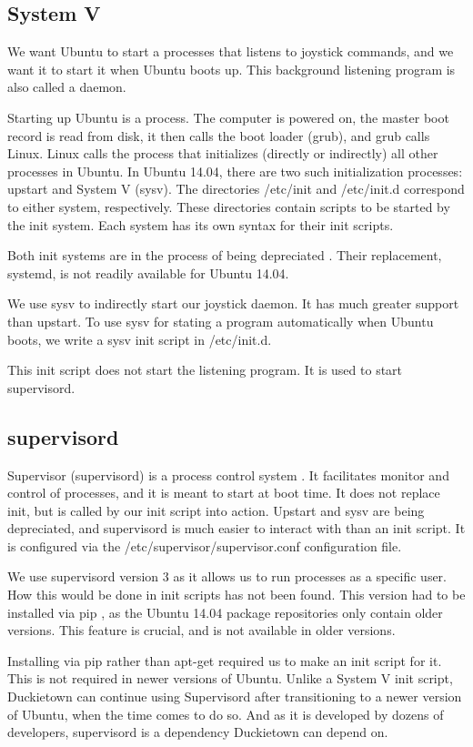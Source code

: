 \documentclass[titlepage]{article}
\begin{document}
\subsection{System V}
We want Ubuntu  to start a processes that listens to joystick commands, and we want it to start it when Ubuntu boots up. This background listening program is also called a daemon. 

Starting up Ubuntu is a process. The computer is powered on, the master boot record is read from disk, it then calls the boot loader (grub), and grub calls Linux. Linux calls the process that initializes (directly or indirectly) all other processes in Ubuntu. 
In Ubuntu 14.04, there are two such initialization processes: upstart and System V (sysv). %
The directories /etc/init and /etc/init.d correspond to either system, respectively. These directories contain scripts to be started by the init system. Each system has its own syntax for their init scripts. 

Both init systems are in the process of being depreciated \cite{shuttleworth}. Their replacement, systemd, is not readily available for Ubuntu 14.04. 

We use sysv to indirectly start our joystick daemon. It has much greater support than upstart. To use sysv for stating a program automatically when Ubuntu boots, we write a sysv init script in /etc/init.d.

This init script does not start the listening program. It is used to start supervisord. 
\subsection{supervisord}
Supervisor (supervisord) is a process control system \cite{supervisord}. It facilitates monitor and control of processes, and it is meant to start at boot time. It does not replace init, but is called by our init script into action. Upstart and sysv are being depreciated, and supervisord is much easier to interact with than an init script. It is configured via the /etc/supervisor/supervisor.conf configuration file.

We use supervisord version 3 as it allows us to run processes as a specific user. How this would be done in init scripts has not been found. This version had to be installed via pip \cite{pypi}, as the Ubuntu 14.04 package repositories only contain older versions. This feature is crucial, and is not available in older versions. 

Installing via pip rather than apt-get required us to make an init script for it. This is not required in newer versions of Ubuntu. Unlike a System V init script, Duckietown can continue using Supervisord after transitioning to a newer version of Ubuntu, when the time comes to do so. And as it is developed by dozens \cite{svd devs} of developers, supervisord is a dependency Duckietown can depend on.
\end{document}
